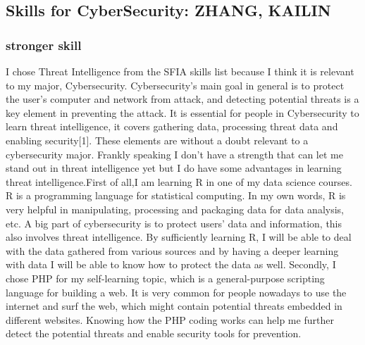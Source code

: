 \documentclass[a4paper, 11pt]{report}
\begin{document}
\subsection{Skills for CyberSecurity: ZHANG, KAILIN}
\subsubsection{stronger skill}
	I chose Threat Intelligence from the SFIA skills list because I think it is relevant to my major, Cybersecurity. Cybersecurity’s main goal in general is to protect the user's computer and network from attack, and detecting potential threats is a key element in preventing the attack. It is essential for people in Cybersecurity to learn threat intelligence, it covers gathering data, processing threat data and enabling security[1]. These elements are without a doubt relevant to a cybersecurity major. Frankly speaking I don’t have a strength that can let me stand out in threat intelligence yet but I do have some advantages in learning threat intelligence.First of all,I am learning R in one of my data science courses. R is a programming language for statistical computing. In my own words, R is very helpful in manipulating, processing and packaging data for data analysis, etc. A big part of cybersecurity is to protect users’ data and information, this also involves threat intelligence. By sufficiently learning R, I will be able to deal with the data gathered from various sources and by having a deeper learning with data I will be able to know how to protect the data as well. Secondly, I chose PHP for my self-learning topic, which is a general-purpose scripting language for building a web. It is very common for people nowadays to use the internet and surf the web, which might contain potential threats embedded in different websites. Knowing how the PHP coding works can help me further detect the potential threats and enable security tools for prevention.
\end{document}
